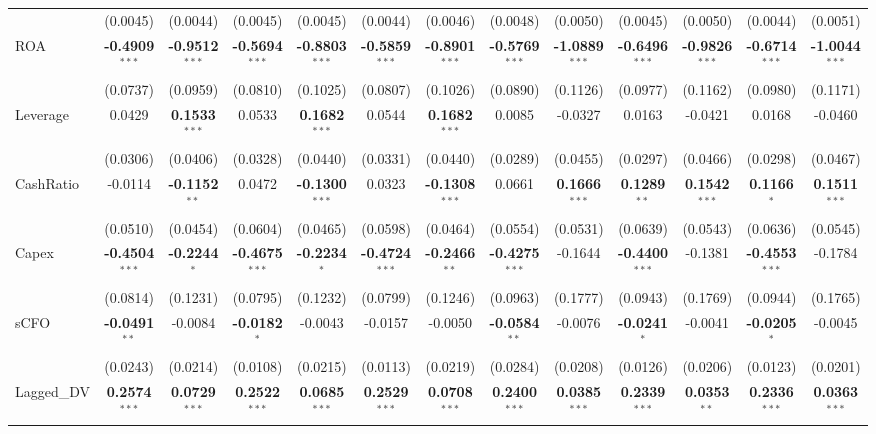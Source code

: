 \documentclass[11pt,a4paper]{article}
\begin{document}
\begin{table}[htbp]
\begin{tabular}{lcccccccccccc}
 & (0.0045) & (0.0044) & (0.0045) & (0.0045) & (0.0044) & (0.0046) & (0.0048) & (0.0050) & (0.0045) & (0.0050) & (0.0044) & (0.0051) \\
ROA & \textbf{-0.4909}$^{***}$ & \textbf{-0.9512}$^{***}$ & \textbf{-0.5694}$^{***}$ & \textbf{-0.8803}$^{***}$ & \textbf{-0.5859}$^{***}$ & \textbf{-0.8901}$^{***}$ & \textbf{-0.5769}$^{***}$ & \textbf{-1.0889}$^{***}$ & \textbf{-0.6496}$^{***}$ & \textbf{-0.9826}$^{***}$ & \textbf{-0.6714}$^{***}$ & \textbf{-1.0044}$^{***}$ \\
 & (0.0737) & (0.0959) & (0.0810) & (0.1025) & (0.0807) & (0.1026) & (0.0890) & (0.1126) & (0.0977) & (0.1162) & (0.0980) & (0.1171) \\
Leverage & 0.0429 & \textbf{0.1533}$^{***}$ & 0.0533 & \textbf{0.1682}$^{***}$ & 0.0544 & \textbf{0.1682}$^{***}$ & 0.0085 & -0.0327 & 0.0163 & -0.0421 & 0.0168 & -0.0460 \\
 & (0.0306) & (0.0406) & (0.0328) & (0.0440) & (0.0331) & (0.0440) & (0.0289) & (0.0455) & (0.0297) & (0.0466) & (0.0298) & (0.0467) \\
CashRatio & -0.0114 & \textbf{-0.1152}$^{**}$ & 0.0472 & \textbf{-0.1300}$^{***}$ & 0.0323 & \textbf{-0.1308}$^{***}$ & 0.0661 & \textbf{0.1666}$^{***}$ & \textbf{0.1289}$^{**}$ & \textbf{0.1542}$^{***}$ & \textbf{0.1166}$^{*}$ & \textbf{0.1511}$^{***}$ \\
 & (0.0510) & (0.0454) & (0.0604) & (0.0465) & (0.0598) & (0.0464) & (0.0554) & (0.0531) & (0.0639) & (0.0543) & (0.0636) & (0.0545) \\
Capex & \textbf{-0.4504}$^{***}$ & \textbf{-0.2244}$^{*}$ & \textbf{-0.4675}$^{***}$ & \textbf{-0.2234}$^{*}$ & \textbf{-0.4724}$^{***}$ & \textbf{-0.2466}$^{**}$ & \textbf{-0.4275}$^{***}$ & -0.1644 & \textbf{-0.4400}$^{***}$ & -0.1381 & \textbf{-0.4553}$^{***}$ & -0.1784 \\
 & (0.0814) & (0.1231) & (0.0795) & (0.1232) & (0.0799) & (0.1246) & (0.0963) & (0.1777) & (0.0943) & (0.1769) & (0.0944) & (0.1765) \\
sCFO & \textbf{-0.0491}$^{**}$ & -0.0084 & \textbf{-0.0182}$^{*}$ & -0.0043 & -0.0157 & -0.0050 & \textbf{-0.0584}$^{**}$ & -0.0076 & \textbf{-0.0241}$^{*}$ & -0.0041 & \textbf{-0.0205}$^{*}$ & -0.0045 \\
 & (0.0243) & (0.0214) & (0.0108) & (0.0215) & (0.0113) & (0.0219) & (0.0284) & (0.0208) & (0.0126) & (0.0206) & (0.0123) & (0.0201) \\
Lagged\_DV & \textbf{0.2574}$^{***}$ & \textbf{0.0729}$^{***}$ & \textbf{0.2522}$^{***}$ & \textbf{0.0685}$^{***}$ & \textbf{0.2529}$^{***}$ & \textbf{0.0708}$^{***}$ & \textbf{0.2400}$^{***}$ & \textbf{0.0385}$^{***}$ & \textbf{0.2339}$^{***}$ & \textbf{0.0353}$^{**}$ & \textbf{0.2336}$^{***}$ & \textbf{0.0363}$^{***}$ \\

\end{tabular}
\end{table}
\end{document}
